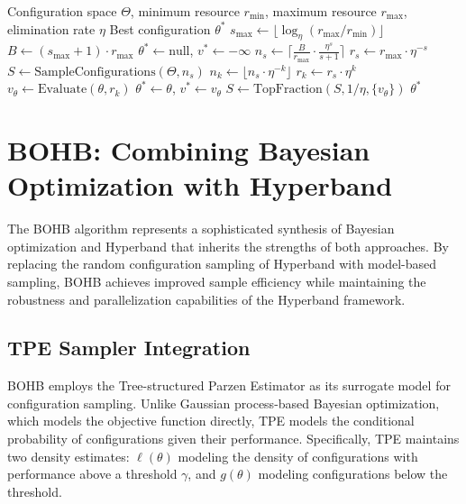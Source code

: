 \begin{algorithm}[htbp]
\caption{Hyperband Algorithm}
\label{alg:hyperband}
\begin{algorithmic}[1]
\Require Configuration space $\Theta$, minimum resource $r_{\min}$, maximum resource $r_{\max}$, elimination rate $\eta$
\Ensure Best configuration $\theta^*$
\State $s_{\max} \gets \lfloor \log_\eta(r_{\max}/r_{\min}) \rfloor$
\State $B \gets (s_{\max} + 1) \cdot r_{\max}$ 
\State $\theta^* \gets \text{null}$, $v^* \gets -\infty$
 
    \State $n_s \gets \lceil \frac{B}{r_{\max}} \cdot \frac{\eta^s}{s+1} \rceil$ 
    \State $r_s \gets r_{\max} \cdot \eta^{-s}$ 
    \State $S \gets \text{SampleConfigurations}(\Theta, n_s)$
     
        \State $n_k \gets \lfloor n_s \cdot \eta^{-k} \rfloor$
        \State $r_k \gets r_s \cdot \eta^k$
            \State $v_\theta \gets \text{Evaluate}(\theta, r_k)$
                \State $\theta^* \gets \theta$, $v^* \gets v_\theta$
            \EndIf
        \EndFor
        \State $S \gets \text{TopFraction}(S, 1/\eta, \{v_\theta\})$
    \EndFor
\EndFor
\State \Return $\theta^*$
\end{algorithmic}
\end{algorithm}

\section{BOHB: Combining Bayesian Optimization with Hyperband}
\label{sec:bohb}

The BOHB algorithm represents a sophisticated synthesis of Bayesian optimization and Hyperband that inherits the strengths of both approaches. By replacing the random configuration sampling of Hyperband with model-based sampling, BOHB achieves improved sample efficiency while maintaining the robustness and parallelization capabilities of the Hyperband framework.

\subsection{TPE Sampler Integration}

BOHB employs the Tree-structured Parzen Estimator as its surrogate model for configuration sampling. Unlike Gaussian process-based Bayesian optimization, which models the objective function directly, TPE models the conditional probability of configurations given their performance. Specifically, TPE maintains two density estimates: $\ell(\theta)$ modeling the density of configurations with performance above a threshold $\gamma$, and $g(\theta)$ modeling configurations below the threshold.

